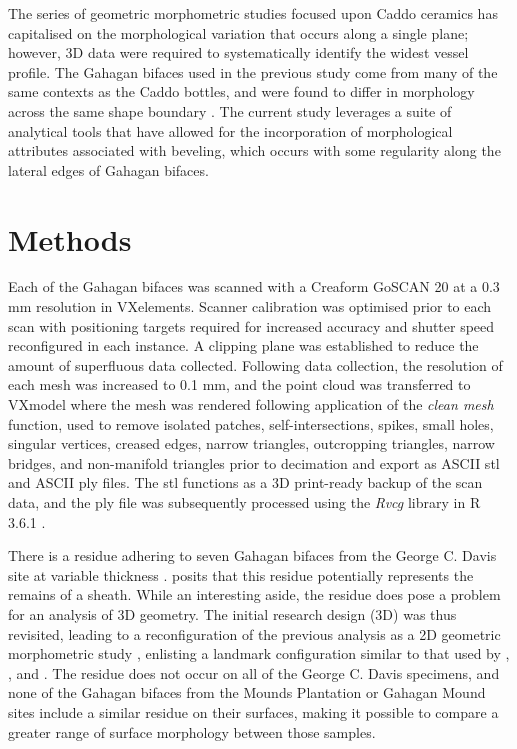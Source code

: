 \documentclass[review]{elsarticle}
\begin{document}
The series of geometric morphometric studies focused upon Caddo ceramics has capitalised on the morphological variation that occurs along a single plane; however, 3D data were required to systematically identify the widest vessel profile. The Gahagan bifaces used in the previous study come from many of the same contexts as the Caddo bottles, and were found to differ in morphology across the same shape boundary \citep[Figure 15.1]{RN11783,RN20852}. The current study leverages a suite of analytical tools that have allowed for the incorporation of morphological attributes associated with beveling, which occurs with some regularity along the lateral edges of Gahagan bifaces.

\section*{Methods}

Each of the Gahagan bifaces was scanned with a Creaform GoSCAN 20 at a 0.3 mm resolution in VXelements. Scanner calibration was optimised prior to each scan with positioning targets required for increased accuracy and shutter speed reconfigured in each instance. A clipping plane was established to reduce the amount of superfluous data collected. Following data collection, the resolution of each mesh was increased to 0.1 mm, and the point cloud was transferred to VXmodel where the mesh was rendered following application of the \textit{clean mesh} function, used to remove isolated patches, self-intersections, spikes, small holes, singular vertices, creased edges, narrow triangles, outcropping triangles, narrow bridges, and non-manifold triangles prior to decimation and export as ASCII stl and ASCII ply files. The stl functions as a 3D print-ready backup of the scan data, and the ply file was subsequently processed using the \textit{Rvcg} library in R 3.6.1 \citep{RN20849,R,RN20850}.

There is a residue adhering to seven Gahagan bifaces from the George C. Davis site at variable thickness \citep[Figure 2]{RN11783}. \citet[228]{RN3684} posits that this residue potentially represents the remains of a sheath. While an interesting aside, the residue does pose a problem for an analysis of 3D geometry. The initial research design (3D) was thus revisited, leading to a reconfiguration of the previous analysis as a 2D geometric morphometric study \citep{RN11783}, enlisting a landmark configuration similar to that used by \citet[Figure 2]{RN1754}, \citet[Figure 2]{RN1736}, and \citet[Figure 1]{RN11731}. The residue does not occur on all of the George C. Davis specimens, and none of the Gahagan bifaces from the Mounds Plantation or Gahagan Mound sites include a similar residue on their surfaces, making it possible to compare a greater range of surface morphology between those samples. 
\end{document}
